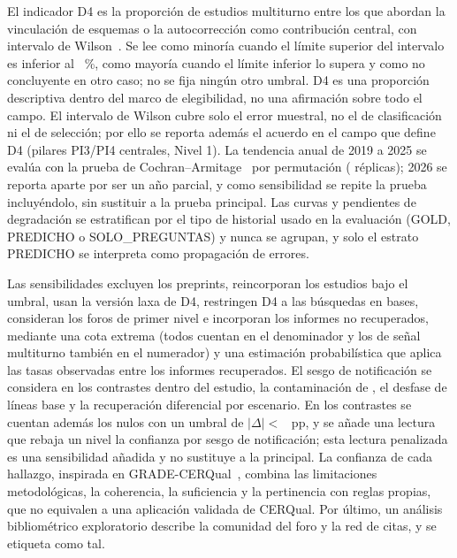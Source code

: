El indicador D4 es la proporción de estudios multiturno entre los que abordan la vinculación de esquemas o la autocorrección como contribución central, con intervalo de Wilson~\cite{Wilson1927Probable}. Se lee como minoría cuando el límite superior del intervalo es inferior al \umbralMayoria~\%, como mayoría cuando el límite inferior lo supera y como no concluyente en otro caso; no se fija ningún otro umbral. D4 es una proporción descriptiva dentro del marco de elegibilidad, no una afirmación sobre todo el campo. El intervalo de Wilson cubre solo el error muestral, no el de clasificación ni el de selección; por ello se reporta además el acuerdo en el campo que define D4 (pilares PI3/PI4 centrales, Nivel 1). La tendencia anual de 2019 a 2025 se evalúa con la prueba de Cochran--Armitage~\cite{Cochran1954Methods,Armitage1955Tests} por permutación (\replicasTendencia{} réplicas); 2026 se reporta aparte por ser un año parcial, y como sensibilidad se repite la prueba incluyéndolo, sin sustituir a la prueba principal. Las curvas y pendientes de degradación se estratifican por el tipo de historial usado en la evaluación (GOLD, PREDICHO o SOLO\_PREGUNTAS) y nunca se agrupan, y solo el estrato PREDICHO se interpreta como propagación de errores.

Las sensibilidades excluyen los preprints, reincorporan los estudios bajo el umbral, usan la versión laxa de D4, restringen D4 a las búsquedas en bases, consideran los foros de primer nivel e incorporan los informes no recuperados, mediante una cota extrema (todos cuentan en el denominador y los de señal multiturno también en el numerador) y una estimación probabilística que aplica las tasas observadas entre los informes recuperados. El sesgo de notificación se considera en los contrastes dentro del estudio, la contaminación de , el desfase de líneas base y la recuperación diferencial por escenario. En los contrastes se cuentan además los nulos con un umbral de $|\Delta| <$ \umbralNulo{}~pp, y se añade una lectura que rebaja un nivel la confianza por sesgo de notificación; esta lectura penalizada es una sensibilidad añadida y no sustituye a la principal. La confianza de cada hallazgo, inspirada en GRADE-CERQual~\cite{Lewin2018CERQual}, combina las limitaciones metodológicas, la coherencia, la suficiencia y la pertinencia con reglas propias, que no equivalen a una aplicación validada de CERQual. Por último, un análisis bibliométrico exploratorio describe la comunidad del foro y la red de citas, y se etiqueta como tal.
